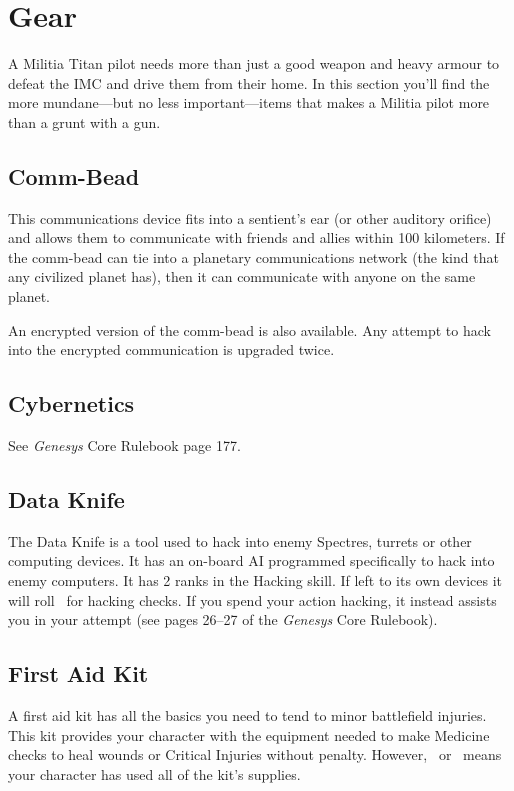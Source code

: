 \documentclass[9pt, openany]{extbook}
\begin{document}
\section{Gear}

A Militia Titan pilot needs more than just a good weapon and heavy armour to defeat the IMC and drive them from their home. In this section you'll find the more mundane---but no less important---items that makes a Militia pilot more than a grunt with a gun.

\subsection{Comm-Bead}
This communications device fits into a sentient’s ear (or other auditory orifice) and allows them to communicate with friends and allies within 100 kilometers. If the comm-bead can tie into a planetary communications network (the kind that any civilized planet has), then it can communicate with anyone on the same planet.

An encrypted version of the comm-bead is also available. Any attempt to hack into the encrypted communication is upgraded twice.

\subsection{Cybernetics}
See \emph{Genesys} Core Rulebook page 177.


\subsection{Data Knife}
The Data Knife is a tool used to hack into enemy Spectres, turrets or other computing devices. It has an on-board AI programmed specifically to hack into enemy computers. It has 2 ranks in the Hacking skill. If left to its own devices it will roll \AbilityDie\AbilityDie\ for hacking checks. If you spend your action hacking, it instead assists you in your attempt (see pages 26--27 of the \emph{Genesys} Core Rulebook).


\subsection{First Aid Kit}
A first aid kit has all the basics you need to tend to minor battlefield injuries. This kit provides your character with the equipment needed to make Medicine checks to heal wounds or Critical Injuries without penalty. However, \Threat\Threat\Threat\ or \Despair\ means your character has used all of the kit’s supplies.
\end{document}
